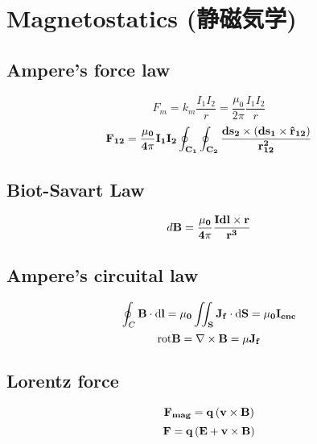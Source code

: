 \section{Magnetostatics (静磁気学)}


\subsection{Ampere's force law}
\[ F_m = k_m \frac{ I_1 I_2 }{r} = \frac{ {\mu}_0 }{ 2\pi  } \frac{ I_1 I_2 }{ r } \]
\[ \bf{F}_{12} = \frac{\mu_0}{4 \pi} I_1 I_2 \oint_{C_1} \oint_{C_2} \frac {d \bf{s_2} \times (d \bf{s_1} \times \hat{\bf{r}}_{12} )} {r_{12}^2} \]

\subsection{Biot-Savart Law}
\[ d\bf{B} = \frac{\mu_0}{4\pi} \frac{ I d\bf{l} \times \bf{r} }{ r^3 }  \]

\subsection{Ampere's circuital law}
\[ \oint_C \bf{B} \cdot \rm{d} \bf{ l } = {\mu}_0 \int\!\!\!\int_S \bf{J_f} \cdot \rm{d}\bf{S} = {\mu}_0 \bf{ I }_{enc} \]
\[ \rm{rot} \bf{B} = \nabla \times \bf{B} = {\mu} \bf{J}_f \]

\subsection{Lorentz force}
\[ \bf{F}_{mag} = q \left( \bf{v} \times \bf{B} \right)  \]
\[ \bf{F} = q \left( \bf{E} + \bf{v} \times \bf{B} \right)  \]